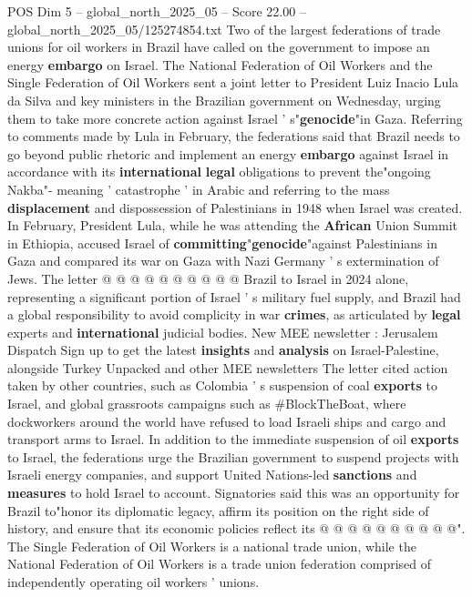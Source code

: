 \begin{textsample}{POS Dim 5 – global\_north\_2025\_05 – Score 22.00 – global\_north\_2025\_05/125274854.txt}  \label{ex:f5_pos_071}
Two of the largest federations of trade unions for oil workers in Brazil have called on the government to impose an energy \textbf{embargo} on Israel.
The National Federation of Oil Workers and the Single Federation of Oil Workers sent a joint letter to President Luiz Inacio Lula da Silva and key ministers in the Brazilian government on Wednesday, urging them to take more concrete action against Israel ' s"\textbf{genocide}"in Gaza.
Referring to comments made by Lula in February, the federations said that Brazil needs to go beyond public rhetoric and implement an energy \textbf{embargo} against Israel in accordance with its \textbf{international} \textbf{legal} obligations to prevent the"ongoing Nakba"- meaning ' catastrophe ' in Arabic and referring to the mass \textbf{displacement} and dispossession of Palestinians in 1948 when Israel was created.
In February, President Lula, while he was attending the \textbf{African} Union Summit in Ethiopia, accused Israel of \textbf{committing}"\textbf{genocide}"against Palestinians in Gaza and compared its war on Gaza with Nazi Germany ' s extermination of Jews.
The letter @ @ @ @ @ @ @ @ @ @ Brazil to Israel in 2024 alone, representing a significant portion of Israel ' s military fuel supply, and Brazil had a global responsibility to avoid complicity in war \textbf{crimes}, as articulated by \textbf{legal} experts and \textbf{international} judicial bodies.
New MEE newsletter : Jerusalem Dispatch Sign up to get the latest \textbf{insights} and \textbf{analysis} on Israel-Palestine, alongside Turkey Unpacked and other MEE newsletters The letter cited action taken by other countries, such as Colombia ' s suspension of coal \textbf{exports} to Israel, and global grassroots campaigns such as \#BlockTheBoat, where dockworkers around the world have refused to load Israeli ships and cargo and transport arms to Israel.
In addition to the immediate suspension of oil \textbf{exports} to Israel, the federations urge the Brazilian government to suspend projects with Israeli energy companies, and support United Nations-led \textbf{sanctions} and \textbf{measures} to hold Israel to account.
Signatories said this was an opportunity for Brazil to"honor its diplomatic legacy, affirm its position on the right side of history, and ensure that its economic policies reflect its @ @ @ @ @ @ @ @ @ @".
The Single Federation of Oil Workers is a national trade union, while the National Federation of Oil Workers is a trade union federation comprised of independently operating oil workers ' unions.

\end{textsample}
